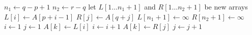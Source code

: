 \begin{algorithmic}
\State $n_{1} \gets q - p + 1$
\State $n_{2} \gets r - q$
\State let $L[1 \dots n_{1}+1]$ and $R[1 \dots n_{2}+1]$ be new arrays
  \State $L[i] \gets A[p + i - 1]$
\EndFor
{}
  \State $R[j] \gets A[q + j]$
\EndFor
\State $L[n_{1} + 1] \gets \infty$
\State $R[n_{2} + 1] \gets \infty$
\State $i \gets 1$
\State $j \gets 1$
    \State $A[k] \gets L[i]$
    \State $i \gets i + 1$
  \Else
    \State $A[k] \gets R[j]$
    \State $j \gets j + 1$
  \EndIf
\EndFor
\EndFunction
\end{algorithmic}